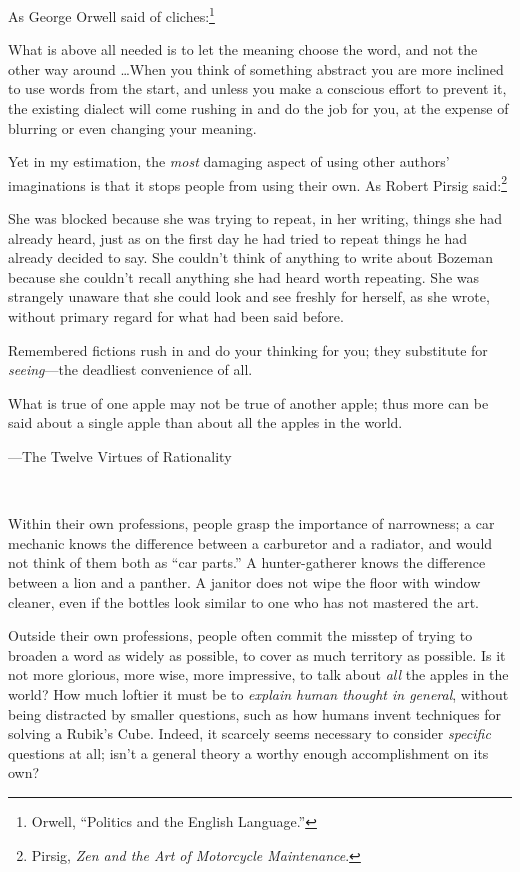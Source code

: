 {
 As George Orwell said of cliches:\footnote{Orwell, ``Politics and the English
Language.''}}

{
 What is above all needed is to let the meaning choose the word,
and not the other way around \ldots When you think of something abstract
you are more inclined to use words from the start, and unless you make
a conscious effort to prevent it, the existing dialect will come
rushing in and do the job for you, at the expense of blurring or even
changing your meaning.}

{
 Yet in my estimation, the \textit{most} damaging aspect of using
other authors' imaginations is that it stops people
from using their own. As Robert Pirsig said:\footnote{Pirsig, \textit{Zen and the Art of Motorcycle Maintenance}.}}

{
 She was blocked because she was trying to repeat, in her writing,
things she had already heard, just as on the first day he had tried to
repeat things he had already decided to say. She
couldn't think of anything to write about Bozeman
because she couldn't recall anything she had heard
worth repeating. She was strangely unaware that she could look and see
freshly for herself, as she wrote, without primary regard for what had
been said before.}

{
 Remembered fictions rush in and do your thinking for you; they
substitute for \textit{seeing}{}---the deadliest convenience of all.}

\myendsectiontext


\bigskip


{
 What is true of one apple may not be true of another apple; thus
more can be said about a single apple than about all the apples in the
world.}

{\raggedleft
 {}---The Twelve Virtues of Rationality
\par}


\bigskip

{
 ~}

{
 Within their own professions, people grasp the importance of
narrowness; a car mechanic knows the difference between a carburetor
and a radiator, and would not think of them both as
``car parts.'' A hunter-gatherer
knows the difference between a lion and a panther. A janitor does not
wipe the floor with window cleaner, even if the bottles look similar to
one who has not mastered the art.}

{
 Outside their own professions, people often commit the misstep of
trying to broaden a word as widely as possible, to cover as much
territory as possible. Is it not more glorious, more wise, more
impressive, to talk about \textit{all} the apples in the world? How
much loftier it must be to \textit{explain human thought in general},
without being distracted by smaller questions, such as how humans
invent techniques for solving a Rubik's Cube. Indeed,
it scarcely seems necessary to consider \textit{specific} questions at
all; isn't a general theory a worthy enough
accomplishment on its own?}

